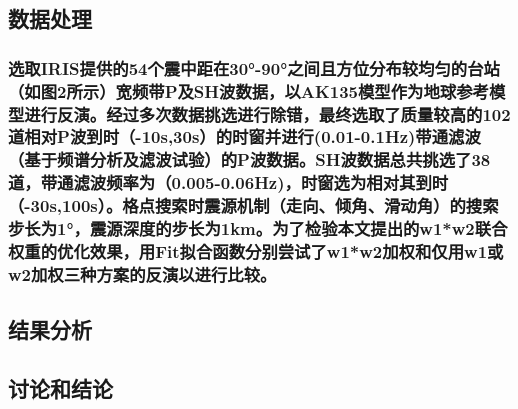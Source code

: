 \documentclass[a4paper,12pt,single,pdftex]{scrartcl}
\begin{document}
\label{ID_1181782570}\subsection{数据处理}

\label{ID_1085717567}\subsubsection{选取IRIS提供的54个震中距在30°-90°之间且方位分布较均匀的台站（如图2所示）宽频带P及SH波数据，以AK135模型\cite{Kennett1995}作为地球参考模型进行反演。经过多次数据挑选进行除错，最终选取了质量较高的102道相对P波到时（-10s,30s）的时窗并进行(0.01-0.1Hz)带通滤波（基于频谱分析及滤波试验）的P波数据。SH波数据总共挑选了38道，带通滤波频率为（0.005-0.06Hz)，时窗选为相对其到时（-30s,100s）。格点搜索时震源机制（走向、倾角、滑动角）的搜索步长为1°，震源深度的步长为1km。为了检验本文提出的w1*w2联合权重的优化效果，用Fit拟合函数分别尝试了w1*w2加权和仅用w1或w2加权三种方案的反演以进行比较。}

\label{ID_491927039}\subsection{结果分析}

\label{ID_1705787296}\subsubsection{}

\label{ID_78066170}\subsubsection{}

\label{ID_1122523796}\subsubsection{}

\label{ID_366051100}\subsubsection{}

\label{ID_1371023412}\subsubsection{}

\label{ID_77282899}\subsection{讨论和结论}
\end{document}
